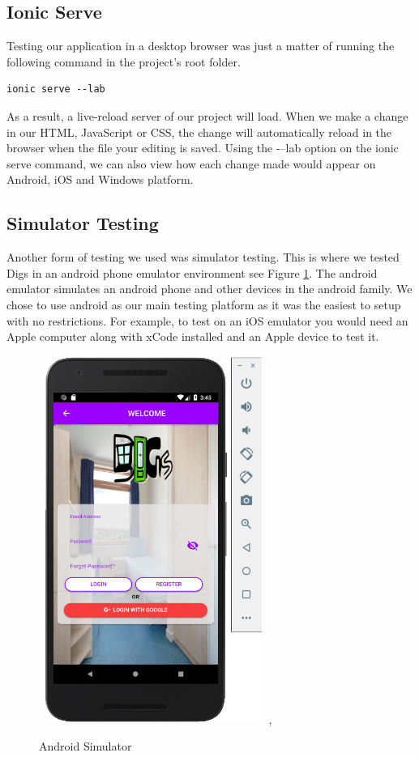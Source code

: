 \subsection{Ionic Serve}
Testing our application in a desktop browser was just a matter of running the following command in the project’s root folder.

\begin{verbatim}
ionic serve --lab
\end{verbatim}

As a result, a live-reload server of our project will load. When we make a change in our HTML, JavaScript or CSS, the change will automatically reload in the browser when the file your editing is saved. Using the -–lab option on the ionic serve command, we can also view how each change made would appear on Android, iOS and Windows platform.

\subsection{Simulator Testing}
Another form of testing we used was simulator testing. This is where we tested Digs in an android phone emulator environment see Figure \ref{android_sim}. The android emulator simulates an android phone and other devices in the android family. We chose to use android as our main testing platform as it was the easiest to setup with no restrictions. For example, to test on an iOS emulator you would need an Apple computer along with xCode installed and an Apple device to test it.

\begin{figure}[h!]
\centering
\includegraphics[width=7.5cm, height=12cm]{img/android_sim.PNG},
\caption{Android Simulator}
\label{android_sim}
\end{figure}

